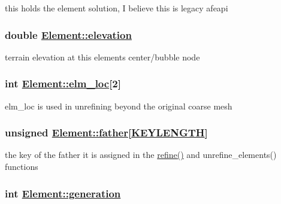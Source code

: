 this holds the element solution, I believe this is legacy afeapi 

\hypertarget{classElement_r37}{
\subsubsection[elevation]{\setlength{\rightskip}{0pt plus 5cm}double \hyperlink{classElement_r37}{Element::elevation}}}
\label{classElement_r37}


terrain elevation at this elements center/bubble node 

\hypertarget{classElement_r25}{
\subsubsection[elm\_\-loc]{\setlength{\rightskip}{0pt plus 5cm}int \hyperlink{classElement_r25}{Element::elm\_\-loc}\mbox{[}2\mbox{]}}}
\label{classElement_r25}


elm\_\-loc is used in unrefining beyond the original coarse mesh 

\hypertarget{classElement_r9}{
\subsubsection[father]{\setlength{\rightskip}{0pt plus 5cm}unsigned \hyperlink{classElement_r9}{Element::father}\mbox{[}\hyperlink{constant_8h_a10}{KEYLENGTH}\mbox{]}}}
\label{classElement_r9}


the key of the father it is assigned in the \hyperlink{hadpt_8C_a5}{refine()} and unrefine\_\-elements() functions 

\hypertarget{classElement_r1}{
\subsubsection[generation]{\setlength{\rightskip}{0pt plus 5cm}int \hyperlink{classElement_r1}{Element::generation}}}
\label{classElement_r1}


